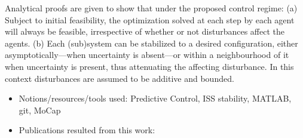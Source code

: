 Analytical proofs are given to show that under the proposed control regime: (a)
Subject to initial feasibility, the optimization solved at each step by each
agent will always be feasible, irrespective of whether or not disturbances
affect the agents. (b) Each (sub)system can be stabilized to a desired
configuration, either asymptotically---when uncertainty is absent---or within a
neighbourhood of it when uncertainty is present, thus attenuating the
affecting disturbance. In this context disturbances are assumed to be additive
and bounded.

\begin{itemize}
\item Notions/resources/tools used: Predictive Control, ISS stability, MATLAB, git, MoCap
\item Publications resulted from this work: \cite{Filotheou2018,Filotheou2020}
\end{itemize}
